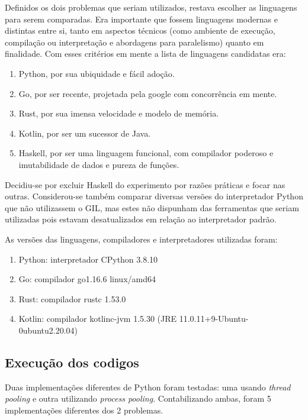 \documentclass[12pt,a4paper]{article}
\begin{document}
Definidos os dois problemas que seriam utilizados, restava escolher as linguagens para serem comparadas. Era importante que fossem linguagens modernas e distintas entre si, tanto em aspectos técnicos (como ambiente de execução, compilação ou interpretação e abordagens para paralelismo) quanto em finalidade. Com esses critérios em mente a lista de linguagens candidatas era:

\begin{enumerate}
    \item Python, por sua ubiquidade e fácil adoção.
    \item Go, por ser recente, projetada pela google com concorrência em mente.
    \item Rust, por sua imensa velocidade e modelo de memória.
    \item Kotlin, por ser um sucessor de Java.
    \item Haskell, por ser uma linguagem funcional, com compilador poderoso e imutabilidade de dados e pureza de funções.
\end{enumerate}

Decidiu-se por excluir Haskell do experimento por razões práticas e focar nas outras. Considerou-se também comparar diversas versões do interpretador Python que não utilizassem o GIL, mas estes não dispunham das ferramentas que seriam utilizadas pois estavam desatualizados em relação ao interpretador padrão.

As versões das linguagens, compiladores e interpretadores utilizadas foram:

\begin{enumerate}
    \item Python: interpretador CPython 3.8.10
    \item Go: compilador go1.16.6 linux/amd64
    \item Rust: compilador rustc 1.53.0
    \item Kotlin: compilador kotlinc-jvm 1.5.30 (JRE 11.0.11+9-Ubuntu-0ubuntu2.20.04)
\end{enumerate}

\subsection{Execução dos codigos}
\label{ssec:execucao dos codigos}

Duas implementações diferentes de Python foram testadas: uma usando \emph{thread pooling} e outra utilizando \emph{process pooling}. Contabilizando ambas, foram 5 implementações diferentes dos 2 problemas.
\end{document}

